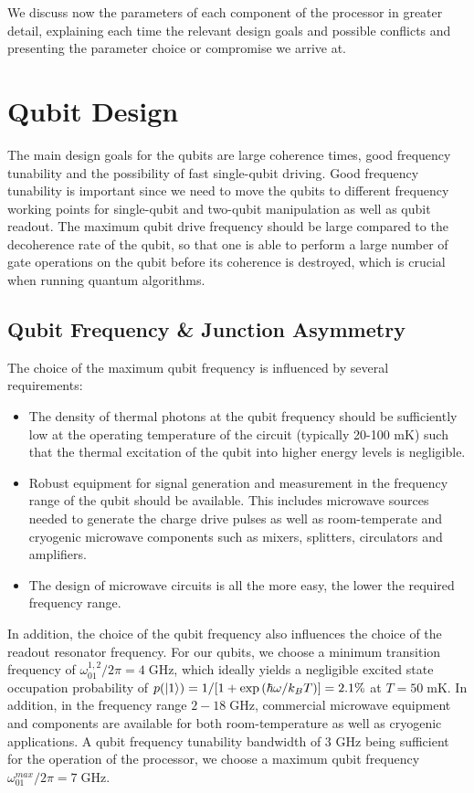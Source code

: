 \smallskip

We discuss now the parameters of each component of the processor in greater detail, explaining each time the relevant design goals and possible conflicts and presenting the parameter choice or compromise we arrive at.

\section{Qubit Design}

The main design goals for the qubits are large coherence times, good frequency tunability and the possibility of fast single-qubit driving. Good frequency tunability is important since we need to move the qubits to different frequency working points for single-qubit and two-qubit manipulation as well as qubit readout. The maximum qubit drive frequency should be large compared to the decoherence rate of the qubit, so that one is able to perform a large number of gate operations on the qubit before its coherence is destroyed, which is crucial when running quantum algorithms.

\subsection{Qubit Frequency \& Junction Asymmetry}

The choice of the maximum qubit frequency is influenced by several requirements:

\begin{itemize}
\item The density of thermal photons at the qubit frequency should be sufficiently low at the operating temperature of the circuit (typically 20-100 mK) such that the thermal excitation of the qubit into higher energy levels is negligible.
\item Robust equipment for signal generation and measurement in the frequency range of the qubit should be available. This includes microwave sources needed to generate the charge drive pulses as well as room-temperate and cryogenic microwave components such as mixers, splitters, circulators and amplifiers.
\item The design of microwave circuits is all the more easy, the lower the required frequency range.
\end{itemize}

In addition, the choice of the qubit frequency also influences the choice of the readout resonator frequency. For our qubits, we choose a minimum transition frequency of $\omega_{01}^{1,2}/2\pi= 4 \;\mathrm{GHz}$, which ideally yields a negligible excited state occupation probability of $p(\left| 1 \right>)=1/[1+\exp{(\hbar \omega / k_B T)}]=2.1\%$ at $T=50\;\mathrm{mK}$. In addition, in the frequency range $2-18\;\mathrm{GHz}$, commercial microwave equipment and components are available for both room-temperature as well as cryogenic applications. A qubit frequency tunability bandwidth of 3 GHz being sufficient for the operation of the processor, we choose a maximum qubit frequency $\omega_{01}^{max}/2\pi = 7\;\mathrm{GHz}$.

